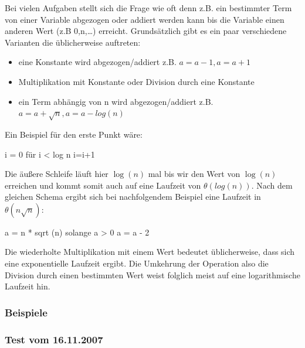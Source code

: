 \documentclass[a4paper, 12pt]{article}
\begin{document}
Bei vielen Aufgaben stellt sich die Frage wie oft denn z.B. ein bestimmter Term von einer Variable abgezogen oder addiert werden kann bis die Variable einen anderen Wert (z.B 0,n,\dots) erreicht. Grundsätzlich gibt es ein paar verschiedene Varianten die üblicherweise auftreten:

\begin{itemize}
	\item eine Konstante wird abgezogen/addiert z.B. $a=a-1, a=a+1$
	\item Multiplikation mit Konstante oder Division durch eine Konstante
	\item ein Term abhängig von n wird abgezogen/addiert z.B.\
	$a=a+\sqrt n, a=a-log\left(n\right)$
\end{itemize}

Ein Beispiel für den erste Punkt wäre:

\begin{verbatimtab}
i = 0
für i < log n {
	i=i+1
}
\end{verbatimtab}

Die äußere Schleife läuft hier $\log\left(n\right)$ mal bis wir den Wert von $\log\left(n\right)$ erreichen und kommt somit auch auf eine Laufzeit von $θ \left(log\left(n\right)\right)$. Nach dem gleichen Schema ergibt sich bei nachfolgendem Beispiel eine Laufzeit in $θ \left(n \sqrt n \right)$:

\begin{verbatimtab}
a = n * sqrt (n)
solange a > 0 {
	a = a - 2
}
\end{verbatimtab}

Die wiederholte Multiplikation mit einem Wert bedeutet üblicherweise, dass sich eine exponentielle Laufzeit ergibt. Die Umkehrung der Operation also die Division durch einen bestimmten Wert weist folglich meist auf eine logarithmische Laufzeit hin.

\subsubsection{Beispiele}

\subsubsection{Test vom 16.11.2007}
\label{section:Test_2007-11-16}
\end{document}
